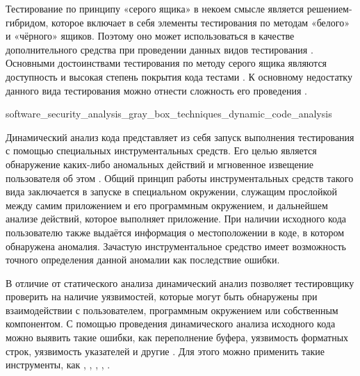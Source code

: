 %
Тестирование по принципу «серого ящика» в некоем смысле является решением-гибридом, которое включает в себя элементы тестирования по методам «белого» и «чёрного» ящиков. 
%
Поэтому оно может использоваться в качестве дополнительного средства при проведении данных видов тестирования . 
%
Основными достоинствами тестирования по методу серого ящика являются доступность и высокая степень покрытия кода тестами . 
%
К основному недостатку данного вида тестирования можно отнести сложность его проведения .


	{software_security_analysis_gray_box_techniques_dynamic_code_analysis}

%
Динамический анализ кода представляет из себя запуск выполнения тестирования  с помощью специальных инструментальных средств. 
%
Его целью является  обнаружение каких-либо аномальных действий и мгновенное извещение пользователя об этом . 
%
Общий принцип работы инструментальных средств такого вида заключается в запуске  в специальном окружении, служащим прослойкой между самим приложением и его программным окружением, и дальнейшем анализе действий, которое выполняет приложение. 
%
При наличии исходного кода пользователю также выдаётся информация о местоположении в коде, в котором обнаружена аномалия. 
%
Зачастую инструментальное средство имеет возможность точного определения данной аномалии как последствие ошибки.

В отличие от статического анализа динамический анализ позволяет тестировщику проверить  на наличие уязвимостей, которые могут быть обнаружены при взаимодействии с пользователем, программным окружением или собственным компонентом. 
%
С помощью проведения динамического анализа исходного кода можно выявить такие ошибки, как переполнение буфера, уязвимость форматных строк, уязвимость указателей и другие . 
%
Для этого можно применить такие инструменты, как  ,  ,  ,  ,  .

